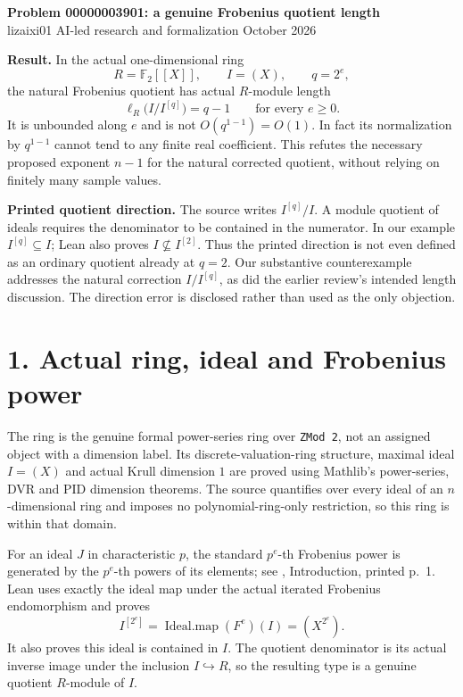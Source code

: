 \documentclass[10pt]{article}
\begin{document}
\begin{center}
{\Large\bfseries Problem 00000003901: a genuine Frobenius quotient length}\\[5pt]
lizaixi01 \quad AI-led research and formalization  October 2026
\end{center}

\textbf{Result.} In the actual one-dimensional ring
\[
 R=\mathbb F_2[[X]],\qquad I=(X),\qquad q=2^e,
\]
the natural Frobenius quotient has actual $R$-module length
\[
 \ell_R\bigl(I/I^{[q]}\bigr)=q-1\qquad\text{for every }e\ge0.
\]
It is unbounded along $e$ and is not $O(q^{1-1})=O(1)$. In fact its normalization by $q^{1-1}$ cannot tend to any finite real coefficient. This refutes the necessary proposed exponent $n-1$ for the natural corrected quotient, without relying on finitely many sample values.

\textbf{Printed quotient direction.} The source writes $I^{[q]}/I$. A module quotient of ideals requires the denominator to be contained in the numerator. In our example $I^{[q]}\subseteq I$; Lean also proves $I\not\subseteq I^{[2]}$. Thus the printed direction is not even defined as an ordinary quotient already at $q=2$. Our substantive counterexample addresses the natural correction $I/I^{[q]}$, as did the earlier review's intended length discussion. The direction error is disclosed rather than used as the only objection.

\section*{1. Actual ring, ideal and Frobenius power}
The ring is the genuine formal power-series ring over \texttt{ZMod 2}, not an assigned object with a dimension label. Its discrete-valuation-ring structure, maximal ideal $I=(X)$ and actual Krull dimension $1$ are proved using Mathlib's power-series, DVR and PID dimension theorems. The source quantifies over every ideal of an $n$-dimensional ring and imposes no polynomial-ring-only restriction, so this ring is within that domain.

For an ideal $J$ in characteristic $p$, the standard $p^e$-th Frobenius power is generated by the $p^e$-th powers of its elements; see \cite{HK}, Introduction, printed p.~1. Lean uses exactly the ideal map under the actual iterated Frobenius endomorphism and proves
\[
 I^{[2^e]}=\operatorname{Ideal.map}(F^e)(I)=(X^{2^e}).
\]
It also proves this ideal is contained in $I$. The quotient denominator is its actual inverse image under the inclusion $I\hookrightarrow R$, so the resulting type is a genuine quotient $R$-module of $I$.
\end{document}
